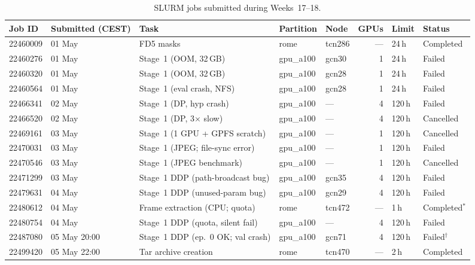 \begin{table}[p]
\centering
\small
\setlength{\tabcolsep}{4pt}
\caption{SLURM jobs submitted during Weeks~17--18.}
\label{tab:jobs}
\begin{tabular}{lp{1.9cm}p{3.2cm}llrll}
\hline
\textbf{Job ID} & \textbf{Submitted (CEST)} & \textbf{Task} & \textbf{Partition} & \textbf{Node} &
\textbf{GPUs} & \textbf{Limit} & \textbf{Status} \\
\hline
22460009 & 01 May        & FD5 masks                         & rome      & tcn286 & —  & 24\,h  & Completed \\
22460276 & 01 May        & Stage~1 (OOM, 32\,GB)            & gpu\_a100 & gcn30  & 1  & 24\,h  & Failed    \\
22460320 & 01 May        & Stage~1 (OOM, 32\,GB)            & gpu\_a100 & gcn28  & 1  & 24\,h  & Failed    \\
22460564 & 01 May        & Stage~1 (eval crash, NFS)        & gpu\_a100 & gcn28  & 1  & 24\,h  & Failed    \\
22466341 & 02 May        & Stage~1 (DP, hyp crash)          & gpu\_a100 & —      & 4  & 120\,h & Failed    \\
22466520 & 02 May        & Stage~1 (DP, 3$\times$ slow)     & gpu\_a100 & —      & 4  & 120\,h & Cancelled \\
22469161 & 03 May        & Stage~1 (1 GPU + GPFS scratch)   & gpu\_a100 & —      & 1  & 120\,h & Cancelled \\
22470031 & 03 May        & Stage~1 (JPEG; file-sync error)  & gpu\_a100 & —      & 1  & 120\,h & Failed    \\
22470546 & 03 May        & Stage~1 (JPEG benchmark)         & gpu\_a100 & —      & 1  & 120\,h & Cancelled \\
22471299 & 03 May        & Stage~1 DDP (path-broadcast bug) & gpu\_a100 & gcn35  & 4  & 120\,h & Failed    \\
22479631 & 04 May        & Stage~1 DDP (unused-param bug)   & gpu\_a100 & gcn29  & 4  & 120\,h & Failed    \\
22480612 & 04 May        & Frame extraction (CPU; quota)    & rome      & tcn472 & —  & 1\,h   & Completed$^*$ \\
22480754 & 04 May        & Stage~1 DDP (quota, silent fail) & gpu\_a100 & —      & 4  & 120\,h & Failed    \\
22487080 & 05 May 20:00  & Stage~1 DDP (ep.~0 OK; val crash)& gpu\_a100 & gcn71  & 4  & 120\,h & Failed$^\dagger$ \\
22499420 & 05 May 22:00  & Tar archive creation              & rome      & tcn470 & —  & 2\,h   & Completed \\

\end{tabular}
\end{table}
